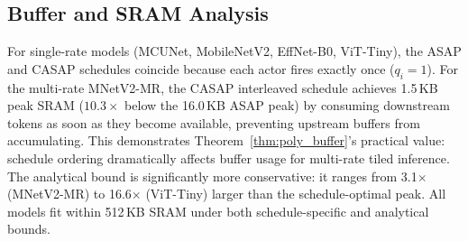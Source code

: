 \documentclass[journal]{IEEEtran}
\begin{document}
\subsection{Buffer and SRAM Analysis}
\label{sec:buffer_results}

\begin{table}[htbp]
\centering
\caption{Buffer Analysis (KB, int8, reduced dimensions). ``CASAP'' is the consume-as-soon-as-possible interleaved schedule from Theorem~\ref{thm:poly_buffer}. ``Gap'' = (ASAP $-$ CASAP)/CASAP. For single-rate models, ASAP and CASAP coincide ($q_i = 1$); for multi-rate MNetV2-MR, CASAP achieves a $10.3\times$ reduction.}
\label{tab:buffer}
\end{table}

For single-rate models (MCUNet, MobileNetV2, EffNet-B0, ViT-Tiny), the ASAP and CASAP schedules coincide because each actor fires exactly once ($q_i = 1$).
For the multi-rate MNetV2-MR, the CASAP interleaved schedule achieves 1.5\,KB peak SRAM ($10.3\times$ below the 16.0\,KB ASAP peak) by consuming downstream tokens as soon as they become available, preventing upstream buffers from accumulating.
This demonstrates Theorem~\ref{thm:poly_buffer}'s practical value: schedule ordering dramatically affects buffer usage for multi-rate tiled inference.
The analytical bound is significantly more conservative: it ranges from 3.1$\times$ (MNetV2-MR) to 16.6$\times$ (ViT-Tiny) larger than the schedule-optimal peak.
All models fit within 512\,KB SRAM under both schedule-specific and analytical bounds.
\end{document}
